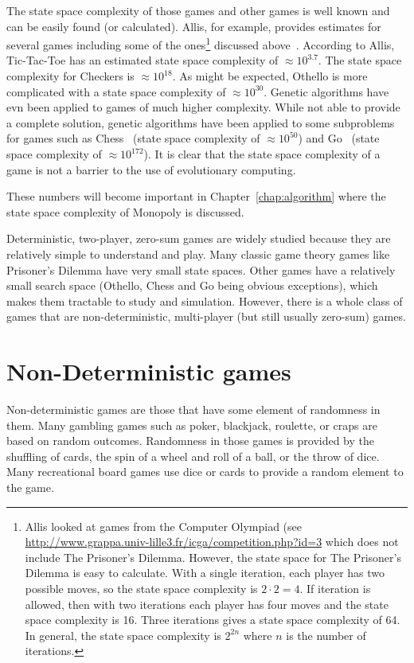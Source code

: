 The state space complexity of those games and other games is well known and can
be easily found (or calculated). Allis, for example, provides estimates for
several games including some of the ones\footnote{Allis looked at games from the
Computer Olympiad (see
\url{http://www.grappa.univ-lille3.fr/icga/competition.php?id=3} which does not
include The Prisoner's Dilemma. However, the state space for The Prisoner's
Dilemma is easy to calculate. With a single iteration, each player has two
possible moves, so the state space complexity is \(2\cdot2=4\). If iteration is
allowed, then with two iterations each player has four moves and the state space
complexity is 16. Three iterations gives a state space complexity of 64. In
general, the state space complexity is \(2^{2n}\) where \(n\) is the number of
iterations.} discussed above~\cite{Allis1994}. According to Allis, Tic-Tac-Toe
has an estimated state space complexity of \(\approx10^{3.7}\). The state space
complexity for Checkers is \(\approx10^{18}\). As might be expected, Othello is
more complicated with a state space complexity of \(\approx10^{30}\). Genetic
algorithms have evn been applied to games of much higher complexity. While not
able to provide a complete solution, genetic algorithms have been applied to
some subproblems for games such as Chess~\cite{Mitsuta:2010:OPG:1994486.1994517}
(state space complexity of \(\approx10^{50}\)) and
Go~\cite{shah2012Go,Blackman2009Go} (state space complexity of
\(\approx10^{172}\)). It is clear that the state space complexity of a game is
not a barrier to the use of evolutionary computing.

These numbers will become important in Chapter~\ref{chap:algorithm} where the
state space complexity of Monopoly is discussed.

Deterministic, two-player, zero-sum games are widely studied because they are
relatively simple to understand and play. Many classic game theory games like
Prisoner's Dilemma have very small state spaces. Other games have a relatively
small search space (Othello, Chess and Go being obvious exceptions), which makes
them tractable to study and simulation. However, there is a whole class of games
that are non-deterministic, multi-player (but still usually zero-sum) games.

\section{Non-Deterministic games}

Non-deterministic games are those that have some element of randomness in them.
Many gambling games such as poker, blackjack, roulette, or craps are based on
random outcomes. Randomness in those games is provided by the shuffling of
cards, the spin of a wheel and roll of a ball, or the throw of dice. Many
recreational board games use dice or cards to provide a random element to the
game.

